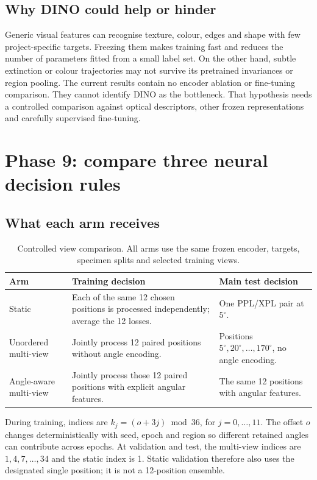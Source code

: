 \subsection{Why DINO could help or hinder}
Generic visual features can recognise texture, colour, edges and shape with few project-specific targets. Freezing them makes training fast and reduces the number of parameters fitted from a small label set. On the other hand, subtle extinction or colour trajectories may not survive its pretrained invariances or region pooling. The current results contain no encoder ablation or fine-tuning comparison. They cannot identify DINO as the bottleneck. That hypothesis needs a controlled comparison against optical descriptors, other frozen representations and carefully supervised fine-tuning.

\section{Phase 9: compare three neural decision rules}
\subsection{What each arm receives}
\begin{table}[htbp]\centering
\begin{tabularx}{\linewidth}{@{}lXX@{}}\toprule Arm & Training decision & Main test decision\\\midrule
Static & Each of the same 12 chosen positions is processed independently; average the 12 losses. & One PPL/XPL pair at $5^\circ$.\\
Unordered multi-view & Jointly process 12 paired positions without angle encoding. & Positions $5^\circ,20^\circ,\ldots,170^\circ$, no angle encoding.\\
Angle-aware multi-view & Jointly process those 12 paired positions with explicit angular features. & The same 12 positions with angular features.\\\bottomrule
\end{tabularx}
\caption{Controlled view comparison. All arms use the same frozen encoder, targets, specimen splits and selected training views.}
\end{table}
During training, indices are $k_j=(o+3j)\bmod36$, for $j=0,\ldots,11$. The offset $o$ changes deterministically with seed, epoch and region so different retained angles can contribute across epochs. At validation and test, the multi-view indices are $1,4,7,\ldots,34$ and the static index is 1. Static validation therefore also uses the designated single position; it is not a 12-position ensemble.

